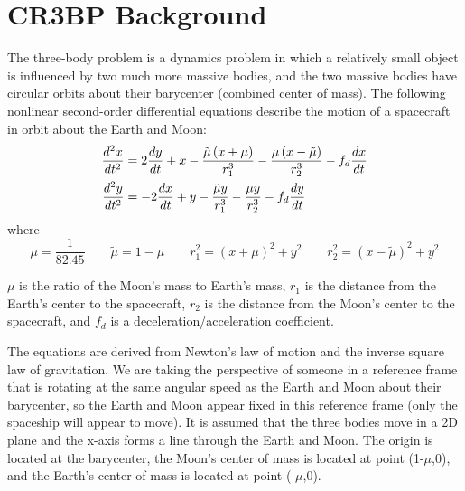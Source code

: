 \section{CR3BP Background}

The \color{magenta} three-body problem \color{white} is a dynamics problem in which a relatively small object is influenced by two much more massive bodies, and the two massive bodies have circular orbits about their barycenter (combined center of mass). The following nonlinear second-order differential equations describe the motion of a spacecraft in orbit about the Earth and Moon:
\color{cyan}
\begin{align}
    \frac{d^2 x}{dt^2} & = 2\frac{dy}{dt} + x - \frac{\tilde{\mu} \left(x+\mu\right)}{r_1^3} - \frac{\mu \left(x-\tilde{\mu}\right)}{r_2^3} - f_d \frac{dx}{dt}
    \label{eq:ODE1}                                                                                                                                          \\
    \frac{d^2 y}{dt^2} & = -2\frac{dx}{dt} + y - \frac{\tilde{\mu}y}{r_1^3} - \frac{\mu y}{r_2^3} - f_d\frac{dy}{dt}
    \label{eq:ODE2}
\end{align}
\color{white} where
\color{orange}
\begin{equation*}
    \mu = \frac{1}{82.45} \qquad \tilde{\mu} = 1 - \mu \qquad r_1^2 = \left(x+\mu\right)^2 + y^2 \qquad r_2^2 = \left(x-\tilde{\mu}\right)^2 + y^2
\end{equation*}

\color{white}

$\mu$ is the ratio of the Moon's mass to Earth's mass, $r_1$ is the distance from the Earth’s center to the
spacecraft, $r_2$ is the distance from the Moon’s center to the spacecraft, and $f_d$ is a deceleration/acceleration
coefficient.

\vspace{\baselineskip}

The equations are derived from Newton’s law of motion and the inverse square law of gravitation. We are taking the perspective of someone in a reference frame that is rotating at the same angular speed as the Earth and Moon about their barycenter, so the Earth and Moon appear fixed in this reference frame (only the spaceship will appear to move). It is assumed that the three bodies move in a 2D plane and the x-axis forms a line through the Earth and Moon. The origin is located at the barycenter, the Moon’s center of mass is located at point (1-$\mu$,0), and the Earth’s center of mass is located at point (-$\mu$,0).

